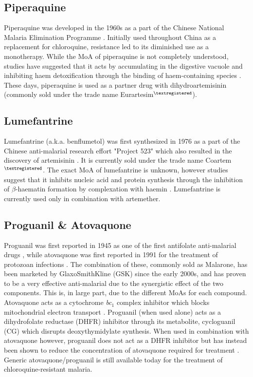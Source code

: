 \documentclass[twocolumn]{bmcart}%
\begin{document}
\subsection*{Piperaquine}
Piperaquine was developed in the 1960s as a part of the Chinese National Malaria Elimination Programme \cite{Chen1982}. Initially used throughout China as a replacement for chloroquine, resistance led to its diminished use as a monotherapy. While the MoA of piperaquine is not completely understood, studies have suggested that it acts by accumulating in the digestive vacuole and inhibiting haem detoxification through the binding of haem-containing species \cite{Vennerstrom1992,Eastman2009}. These days, piperaquine is used as a partner drug with dihydroartemisinin (commonly sold under the trade name Eurartesim$^{\scriptsize{\textregistered}}$).

\subsection*{Lumefantrine}
Lumefantrine (a.k.a. benflumetol) was first synthesized in 1976 as a part of the Chinese anti-malarial research effort "Project 523" which also resulted in the discovery of artemisinin \cite{Cui2009}. It is currently sold under the trade name Coartem$^{\scriptsize{\textregistered}}$. The exact MoA of lumefantrine is unknown, however studies suggest that it inhibits nucleic acid and protein synthesis through the inhibition of $\beta$-haematin formation by complexation with haemin \cite{Combrinck2012}. Lumefantrine is currently used only in combination with artemether.

\subsection*{Proguanil \& Atovaquone}
Proguanil was first reported in 1945 as one of the first antifolate anti-malarial drugs \cite{Curd1945}, while atovaquone was first reported in 1991 for the treatment of protozoan infections \cite{Hudson1991}. The combination of these, commonly sold as Malarone\texttrademark, has been marketed by GlaxoSmithKline (GSK) since the early 2000s, and has proven to be a very effective anti-malarial due to the synergistic effect of the two components. This is, in large part, due to the different MoAs for each compound. Atovaquone acts as a cytochrome \textit{bc}$_\textrm{1}$ complex inhibitor which blocks mitochondrial electron transport \cite{Fry1992}. Proguanil (when used alone) acts as a dihydrofolate reductase (DHFR) inhibitor through its metabolite, cycloguanil (CG) which disrupts deoxythymidylate synthesis. When used in combination with atovaquone however, proguanil does not act as a DHFR inhibitor but has instead been shown to reduce the concentration of atovaquone required for treatment \cite{Srivastava1999}. Generic atovaquone/proguanil is still available today for the treatment of chloroquine-resistant malaria.
\end{document}
